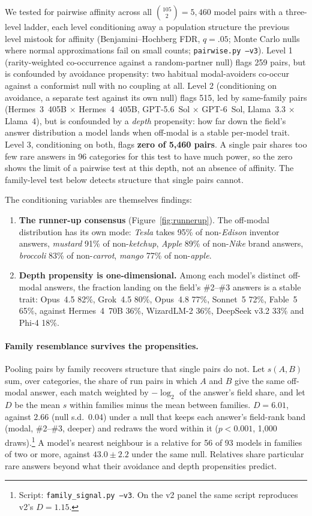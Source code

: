 \documentclass[11pt]{article}
\begin{document}
We tested for pairwise affinity across all $\binom{105}{2} = 5{,}460$ model pairs with a three-level ladder, each level conditioning away a population structure the previous level mistook for affinity (Benjamini--Hochberg FDR, $q = .05$; Monte Carlo nulls where normal approximations fail on small counts; \texttt{pairwise.py --v3}). Level 1 (rarity-weighted co-occurrence against a random-partner null) flags 259 pairs, but is confounded by avoidance propensity: two habitual modal-avoiders co-occur against a conformist null with no coupling at all. Level 2 (conditioning on avoidance, a separate test against its own null) flags 515, led by same-family pairs (Hermes~3~405B $\times$ Hermes~4~405B, GPT-5.6~Sol $\times$ GPT-6~Sol, Llama~3.3 $\times$ Llama~4), but is confounded by a \emph{depth} propensity: how far down the field's answer distribution a model lands when off-modal is a stable per-model trait. Level 3, conditioning on both, flags \textbf{zero of 5{,}460 pairs}. A single pair shares too few rare answers in 96 categories for this test to have much power, so the zero shows the limit of a pairwise test at this depth, not an absence of affinity. The family-level test below detects structure that single pairs cannot.

The conditioning variables are themselves findings:

\begin{enumerate}
\item \textbf{The runner-up consensus} (Figure~\ref{fig:runnerup}). The off-modal distribution has its own mode: \emph{Tesla} takes 95\% of non-\emph{Edison} inventor answers, \emph{mustard} 91\% of non-\emph{ketchup}, \emph{Apple} 89\% of non-\emph{Nike} brand answers, \emph{broccoli} 83\% of non-\emph{carrot}, \emph{mango} 77\% of non-\emph{apple}.
\item \textbf{Depth propensity is one-dimensional.} Among each model's distinct off-modal answers, the fraction landing on the field's \#2--\#3 answers is a stable trait: Opus~4.5 82\%, Grok~4.5 80\%, Opus~4.8 77\%, Sonnet~5 72\%, Fable~5 65\%, against Hermes~4~70B 36\%, WizardLM-2 36\%, DeepSeek v3.2 33\% and Phi-4 18\%.
\end{enumerate}

\paragraph{Family resemblance survives the propensities.}
Pooling pairs by family recovers structure that single pairs do not. Let $s(A,B)$ sum, over categories, the share of run pairs in which $A$ and $B$ give the same off-modal answer, each match weighted by $-\log_2$ of the answer's field share, and let $D$ be the mean $s$ within families minus the mean between families. $D = 6.01$, against $2.66$ (null s.d.\ 0.04) under a null that keeps each answer's field-rank band (modal, \#2--\#3, deeper) and redraws the word within it ($p < 0.001$, 1{,}000 draws).\footnote{Script: \texttt{family\_signal.py --v3}. On the v2 panel the same script reproduces v2's $D = 1.15$.} A model's nearest neighbour is a relative for 56 of 93 models in families of two or more, against $43.0 \pm 2.2$ under the same null. Relatives share particular rare answers beyond what their avoidance and depth propensities predict.
\end{document}
